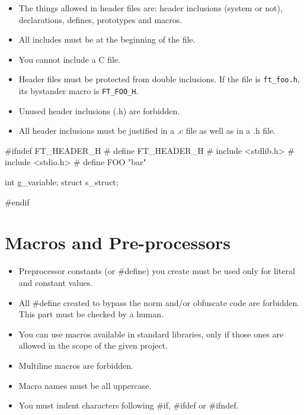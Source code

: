 \documentclass{42-en}
\begin{document}
        \begin{itemize}

            \item The things allowed in header files are:
                header inclusions (system or not), declarations, defines,
                prototypes and macros.

            \item All includes must be at the beginning of the file.

            \item You cannot include a C file.

            \item Header files must be protected from double inclusions. If the file is
            \texttt{ft\_foo.h}, its bystander macro is \texttt{FT\_FOO\_H}.

            \item Unused header inclusions (.h) are forbidden.

            \item All header inclusions must be justified in a .c file
                as well as in a .h file.

        \end{itemize}

        \begin{42ccode}
#ifndef FT_HEADER_H
# define FT_HEADER_H
# include <stdlib.h>
# include <stdio.h>
# define FOO "bar"

int g_variable;
struct s_struct;

#endif
        \end{42ccode}
        \newpage

    \section{Macros and Pre-processors}

        \begin{itemize}

            \item Preprocessor constants (or \#define) you create must be used
                only for literal and constant values.
            \item All \#define created to bypass the norm and/or obfuscate
                code are forbidden. This part must be checked by a human.
            \item You can use macros available in standard libraries, only
                if those ones are allowed in the scope of the given project.
            \item Multiline macros are forbidden.
            \item Macro names must be all uppercase.
            \item You must indent characters following \#if, \#ifdef
                or \#ifndef.

        \end{itemize}
        \newpage
\end{document}
